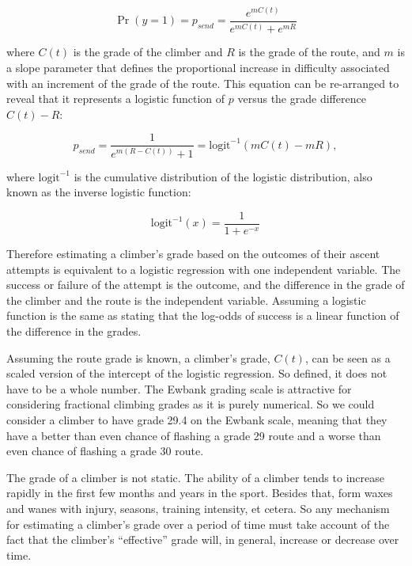 \documentclass[12pt]{article}
\begin{document}
\begin{equation}
\Pr(y = 1) = p_{send} = \frac{e^{mC(t)}}{e^{mC(t)} + e^{mR}}
\end{equation}

where $C(t)$ is the grade of the climber and $R$ is the grade of the route, and $m$ is a slope parameter that defines the proportional increase in difficulty associated with an increment of the grade of the route. This equation can be re-arranged to reveal that it represents a logistic function of $p$ versus the grade difference $C(t)-R$:

\begin{equation}
p_{send} = \frac{1}{e^{m(R-C(t))} + 1} = \textrm{logit}^{-1}(mC(t)-mR),
\label{logisticp}
\end{equation}

where $\textrm{logit}^{-1}$ is the cumulative distribution of the logistic distribution, also known as the inverse logistic function:

\begin{equation}
\textrm{logit}^{-1}(x) = \frac{1}{1 + e^{-x}}
\end{equation}

Therefore estimating a climber's grade based on the outcomes of their ascent attempts is equivalent to a logistic regression with one independent variable. The success or failure of the attempt is the outcome, and the difference in the grade of the climber and the route is the independent variable. Assuming a logistic function is the same as stating that the log-odds of success is a linear function of the difference in the grades.

Assuming the route grade is known, a climber's grade, $C(t)$, can be seen as a scaled version of the intercept of the logistic regression. So defined, it does not have to be a whole number. The Ewbank grading scale is attractive for considering fractional climbing grades as it is purely numerical. So we could consider a climber to have grade 29.4 on the Ewbank scale, meaning that they have a better than even chance of flashing a grade 29 route and a worse than even chance of flashing a grade 30 route.

The grade of a climber is not static. The ability of a climber tends to increase rapidly in the first few months and years in the sport. Besides that, form waxes and wanes with injury, seasons, training intensity, et cetera. So any mechanism for estimating a climber's grade over a period of time must take account of the fact that the climber's ``effective'' grade will, in general, increase or decrease over time.
\end{document}
